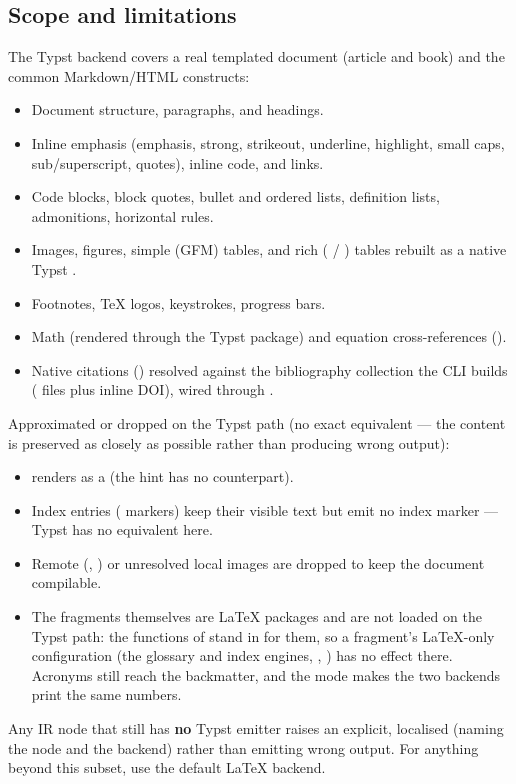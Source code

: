 \documentclass[a4paper,twoside]{article}
\begin{document}
\subsection{Scope and limitations}
\label{scope-and-limitations}
The Typst backend covers a real templated document (article and book) and the
common Markdown/HTML constructs:
\begin{itemize}
\item Document structure, paragraphs, and headings.
\item Inline emphasis (emphasis, strong, strikeout, underline, highlight, small
caps, sub/superscript, quotes), inline code, and links.
\item Code blocks, block quotes, bullet and ordered lists, definition lists,
admonitions, horizontal rules.
\item Images, figures, simple (GFM) tables, and rich ( / ) tables
rebuilt as a native Typst .
\item Footnotes, \TeX{} logos, keystrokes, progress bars.
\item Math (rendered through the Typst  package) and equation
cross-references ().
\item Native citations () resolved against the bibliography collection the
CLI builds ( files plus inline DOI), wired through .
\end{itemize}
Approximated or dropped on the Typst path (no exact equivalent --- the content is
preserved as closely as possible rather than producing wrong output):
\begin{itemize}
\item {} renders as a  (the  hint has no counterpart).
\item Index entries ( markers) keep their visible text but emit no index
marker --- Typst has no  equivalent here.
\item Remote (, ) or unresolved local images are dropped to keep
the document compilable.
\item The  fragments themselves are \LaTeX{} packages and are not loaded on the
Typst path: the  functions of  stand in for them, so a
fragment's \LaTeX{}-only configuration (the glossary and index engines,
, ) has no effect there. Acronyms still reach the
backmatter, and the  mode makes the two backends print the
same numbers.
\end{itemize}
Any IR node that still has \textbf{no} Typst emitter raises an explicit, localised
 (naming the node and the backend) rather than emitting wrong
output. For anything beyond this subset, use the default \LaTeX{} backend.
\end{document}
